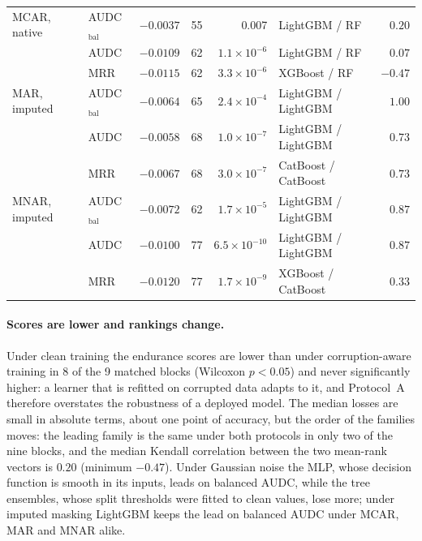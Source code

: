 \documentclass[pdflatex,sn-mathphys]{sn-jnl}
\theoremstyle{thmstyleone}
\theoremstyle{thmstyletwo}
\theoremstyle{thmstylethree}
\begin{document}
\begin{table}[t]
\begin{tabular}{@{}llrrrlr@{}}
MCAR, native & AUDC$_{\mathrm{bal}}$ & $-0.0037$ & 55 & 0.007 & LightGBM / RF & $0.20$ \\
 & AUDC & $-0.0109$ & 62 & $1.1\times10^{-6}$ & LightGBM / RF & $0.07$ \\
 & MRR & $-0.0115$ & 62 & $3.3\times10^{-6}$ & XGBoost / RF & $-0.47$ \\
\midrule
MAR, imputed & AUDC$_{\mathrm{bal}}$ & $-0.0064$ & 65 & $2.4\times10^{-4}$ & LightGBM / LightGBM & $1.00$ \\
 & AUDC & $-0.0058$ & 68 & $1.0\times10^{-7}$ & LightGBM / LightGBM & $0.73$ \\
 & MRR & $-0.0067$ & 68 & $3.0\times10^{-7}$ & CatBoost / CatBoost & $0.73$ \\
MNAR, imputed & AUDC$_{\mathrm{bal}}$ & $-0.0072$ & 62 & $1.7\times10^{-5}$ & LightGBM / LightGBM & $0.87$ \\
 & AUDC & $-0.0100$ & 77 & $6.5\times10^{-10}$ & LightGBM / LightGBM & $0.87$ \\
 & MRR & $-0.0120$ & 77 & $1.7\times10^{-9}$ & XGBoost / CatBoost & $0.33$ \\
\bottomrule
\end{tabular}
\end{table}

\paragraph{Scores are lower and rankings change.} Under clean training the endurance scores are lower than under corruption-aware training in 8 of the 9 matched blocks (Wilcoxon $p<0.05$) and never significantly higher: a learner that is refitted on corrupted data adapts to it, and Protocol~A therefore overstates the robustness of a deployed model. The median losses are small in absolute terms, about one point of accuracy, but the order of the families moves: the leading family is the same under both protocols in only two of the nine blocks, and the median Kendall correlation between the two mean-rank vectors is $0.20$ (minimum $-0.47$). Under Gaussian noise the MLP, whose decision function is smooth in its inputs, leads on balanced AUDC, while the tree ensembles, whose split thresholds were fitted to clean values, lose more; under imputed masking LightGBM keeps the lead on balanced AUDC under MCAR, MAR and MNAR alike.
\end{document}
